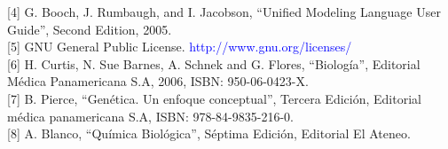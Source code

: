 \documentclass[12pt,a4paper]{article}
\begin{document}
[4] G. Booch, J. Rumbaugh, and I. Jacobson, “Unified Modeling Language User Guide”, Second Edition, 2005. \\

[5] GNU General Public License. \textcolor{blue}{http://www.gnu.org/licenses/} \\

[6] H. Curtis, N. Sue Barnes, A. Schnek and G. Flores, “Biología”, Editorial Médica Panamericana S.A, 2006, ISBN: 950-06-0423-X. \\

[7] B. Pierce, “Genética. Un enfoque conceptual”, Tercera Edición, Editorial médica panamericana S.A, ISBN: 978-84-9835-216-0. \\

[8] A. Blanco, “Química Biológica”, Séptima Edición, Editorial El Ateneo.
\end{document}
